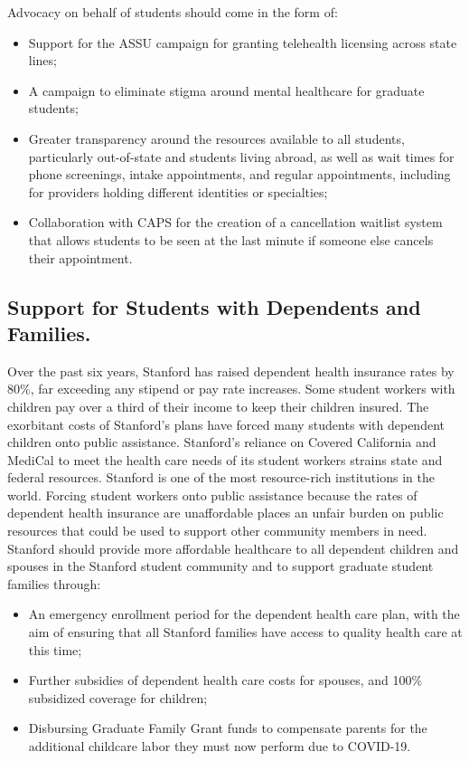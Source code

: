 \documentclass[12pt, titlepage, letterpaper]{article}
\begin{document}
\newpage
Advocacy on behalf of students should come in the form of:
\begin{itemize}
    \item Support for the ASSU campaign for granting telehealth licensing across state lines; 
    \item A campaign to eliminate stigma around mental healthcare for graduate students; 
    \item Greater transparency around the resources available to all students, particularly out-of-state and students living abroad, as well as wait times for phone screenings, intake appointments, and regular appointments, including for providers holding different identities or specialties;
    \item Collaboration with CAPS for the creation of a cancellation waitlist system that allows students to be seen at the last minute if someone else cancels their appointment. 
\end{itemize}

\subsection*{Support for Students with Dependents and Families.}
%

Over the past six years, Stanford has raised dependent health insurance rates by 80\%, far exceeding any stipend or pay rate increases. Some student workers with children pay over a third of their income to keep their children insured. The exorbitant costs of Stanford’s plans have forced many students with dependent children onto public assistance. Stanford’s reliance on Covered California and MediCal to meet the health care needs of its student workers strains state and federal resources. Stanford is one of the most resource-rich institutions in the world. Forcing student workers onto public assistance because the rates of dependent health insurance are unaffordable places an unfair burden on public resources that could be used to support other community members in need. Stanford should provide more affordable healthcare to all dependent children and spouses in the Stanford student community and to support graduate student families through:
\begin{itemize}
    \item An emergency enrollment period for the dependent health care plan, with the aim of ensuring that all Stanford families have access to quality health care at this time;
    \item Further subsidies of dependent health care costs for spouses, and 100\% subsidized coverage for children;
    \item Disbursing Graduate Family Grant funds to compensate parents for the additional childcare labor they must now perform due to COVID-19.
\end{itemize}
\end{document}
